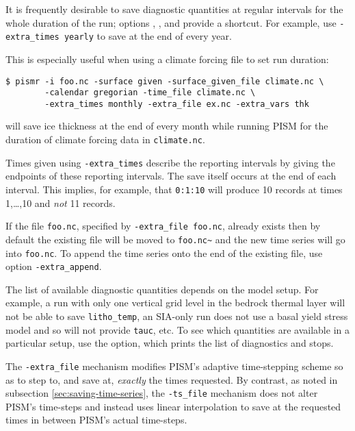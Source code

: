 It is frequently desirable to save diagnostic quantities at regular intervals for the whole duration of the run; options , , and  provide a shortcut. For example, use \texttt{-extra_times yearly} to save at the end of every year.

This is especially useful when using a climate forcing file to set run duration:
\begin{verbatim}
$ pismr -i foo.nc -surface given -surface_given_file climate.nc \
        -calendar gregorian -time_file climate.nc \
        -extra_times monthly -extra_file ex.nc -extra_vars thk
\end{verbatim}
will save ice thickness at the end of every month while running PISM for the duration of climate forcing data in \texttt{climate.nc}.

Times given using \texttt{-extra_times} describe the reporting intervals by giving the endpoints of these reporting intervals.  The save itself occurs at the end of each interval.  This implies, for example, that \texttt{0:1:10} will produce 10 records at times 1,\dots,10 and \emph{not} 11 records.

If the file \texttt{foo.nc}, specified by \texttt{-extra_file foo.nc}, already exists then by default the existing file will be moved to \texttt{foo.nc\~} and the new time series will go into \texttt{foo.nc}.  To append the time series onto the end of the existing file, use option \texttt{-extra_append}.

The list of available diagnostic quantities depends on the model setup. For
example, a run with only one vertical grid level in the bedrock thermal layer
will not be able to save \texttt{litho_temp}, an SIA-only run does not use a
basal yield stress model and so will not provide \texttt{tauc}, etc. To see
which quantities are available in a particular setup, use the
\intextoption{list_diagnostics} option, which prints the list of diagnostics
and stops.

The \texttt{-extra_file} mechanism modifies PISM's adaptive time-stepping scheme so as to step to, and save at,
\emph{exactly} the times requested.  By contrast, as noted in subsection \ref{sec:saving-time-series}, the \texttt{-ts_file} mechanism does not alter PISM's time-steps and instead uses linear interpolation to save at the requested times in between PISM's actual time-steps.

